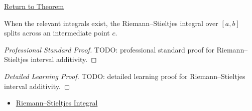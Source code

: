 \newpage
{}
\label{prf:rs-interval-additivity}

\begin{remark*}[Return]
\hyperref[thm:rs-interval-additivity]{Return to Theorem}
\end{remark*}

\begin{theorem*}
When the relevant integrals exist, the Riemann--Stieltjes integral over
\([a,b]\) splits across an intermediate point \(c\).
\end{theorem*}

\begin{proof}[Professional Standard Proof]
\LRAProofBodyStart
TODO: professional standard proof for Riemann--Stieltjes interval additivity.
\end{proof}

\begin{proof}[Detailed Learning Proof]
\LRAProofBodyStart
TODO: detailed learning proof for Riemann--Stieltjes interval additivity.
\end{proof}

\begin{remark*}
\end{remark*}

\begin{dependencies}
\begin{itemize}
  \item \hyperref[def:riemann-stieltjes-integral]{Riemann--Stieltjes Integral}
\end{itemize}
\end{dependencies}

\clearpage
